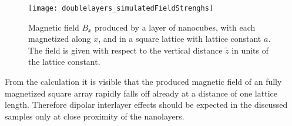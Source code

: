 \documentclass[\main/dresen_thesis.tex]{subfiles}
\begin{document}
  \begin{figure}[tb]
    \centering
    \texttt{[image: doublelayers\_simulatedFieldStrenghs]}
    \caption{\label{fig:doubleLayers:layerMagneticField}Magnetic field $B_x$ produced by a layer of nanocubes, with each magnetized along $x$, and in a square lattice with lattice constant $a$. The field is given with respect to the vertical distance $\tilde{z}$ in units of the lattice constant.}
  \end{figure}

  From the calculation it is visible that the produced magnetic field of an fully magnetized square array rapidly falls off already at a distance of one lattice length.
  Therefore dipolar interlayer effects should be expected in the discussed samples only at close proximity of the nanolayers.
\end{document}
